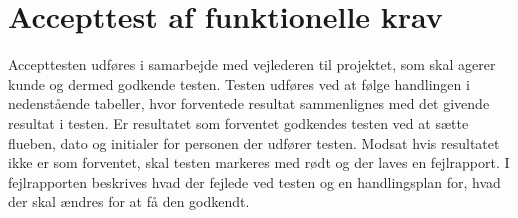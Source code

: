 \section{Accepttest af funktionelle krav}
Accepttesten udføres i samarbejde med vejlederen til projektet, som skal agerer kunde og dermed godkende testen. Testen udføres ved at følge handlingen i nedenstående tabeller, hvor forventede resultat sammenlignes med det givende resultat i testen. Er resultatet som forventet godkendes testen ved at sætte flueben, dato og initialer for personen der udfører testen. Modsat hvis resultatet ikke er som forventet, skal testen markeres med rødt og der laves en fejlrapport. I fejlrapporten beskrives hvad der fejlede ved testen og en handlingsplan for, hvad der skal ændres for at få den godkendt. 




